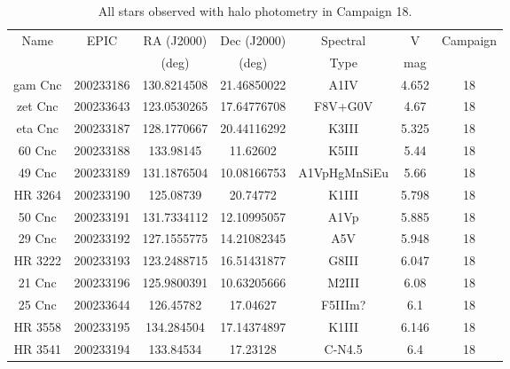 \begin{table*}
\caption{All stars observed with halo photometry in Campaign 18.\label{table_c18}}
\begin{tabular}{ccccccc}
\hline \hline
Name & EPIC & RA (J2000) & Dec (J2000) & Spectral & V & Campaign \\
 &  & (deg) & (deg) & Type & mag &  \\
\hline
gam Cnc & 200233186 & 130.8214508 & 21.46850022 & A1IV & 4.652 & 18 \\
zet Cnc & 200233643 & 123.0530265 & 17.64776708 & F8V+G0V & 4.67 & 18 \\
eta Cnc & 200233187 & 128.1770667 & 20.44116292 & K3III & 5.325 & 18 \\
60 Cnc & 200233188 & 133.98145 & 11.62602 & K5III & 5.44 & 18 \\
49 Cnc & 200233189 & 131.1876504 & 10.08166753 & A1VpHgMnSiEu & 5.66 & 18 \\
HR 3264 & 200233190 & 125.08739 & 20.74772 & K1III & 5.798 & 18 \\
50 Cnc & 200233191 & 131.7334112 & 12.10995057 & A1Vp & 5.885 & 18 \\
29 Cnc & 200233192 & 127.1555775 & 14.21082345 & A5V & 5.948 & 18 \\
HR 3222 & 200233193 & 123.2488715 & 16.51431877 & G8III & 6.047 & 18 \\
21 Cnc & 200233196 & 125.9800391 & 10.63205666 & M2III & 6.08 & 18 \\
25 Cnc & 200233644 & 126.45782 & 17.04627 & F5IIIm? & 6.1 & 18 \\
HR 3558 & 200233195 & 134.284504 & 17.14374897 & K1III & 6.146 & 18 \\
HR 3541 & 200233194 & 133.84534 & 17.23128 & C-N4.5 & 6.4 & 18 \\
\hline
\end{tabular}
\end{table*}

